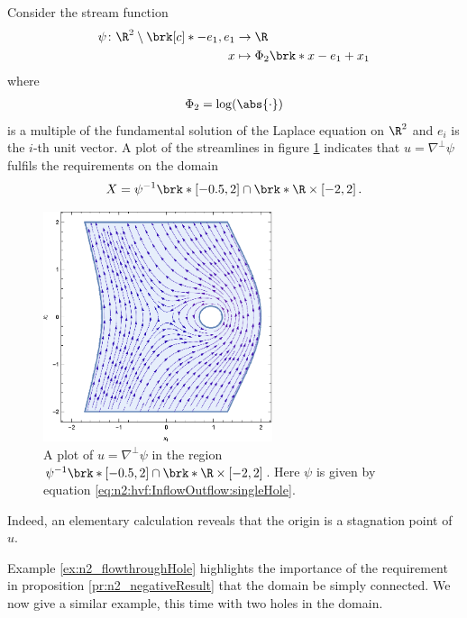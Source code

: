 \begin{example}\label{ex:n2_flowthroughHole}
  Consider the stream function
  \begin{equation}
    \begin{aligned}
    \psi\colon \R^2\setminus\brk[c]*{-e_1,e_1}&\to\R \\
    x&\mapsto\Phi_2\brk*{x-e_1}+x_1
    \end{aligned}\label{eq:n2:hvf:InflowOutflow:singleHole}
  \end{equation}
  where
  \begin{align}
    \Phi_2=\log(\abs{\cdot})\label{eq:n2_defPhi}
  \end{align}
  is a multiple of the fundamental solution of the Laplace equation on $\R^2$ and $e_i$ is the $i$-th unit vector.
  A plot of the streamlines in figure \ref{pl:n2_hvf_InflowOutflow_asymmetric_single} indicates that $u=\nabla^\perp\psi$ fulfils the
  requirements on the domain
  $$X=\psi^{-1}\brk*{[-0.5,2]}\cap \brk*{\R\times[-2,2]}\,.$$
  \begin{figure}
    \centering
    \includegraphics[width=0.6\textwidth]{../Plots/HarmonicVectorFields_gr3.eps}
    \caption{A plot of $u=\nabla^\perp\psi$ in the region $\psi^{-1}\brk*{[-0.5,2]}\cap \brk*{\R\times[-2,2]}$.
    Here $\psi$ is given by equation \eqref{eq:n2:hvf:InflowOutflow:singleHole}.}
    \label{pl:n2_hvf_InflowOutflow_asymmetric_single}
  \end{figure}
  Indeed, an elementary calculation reveals that the origin is a stagnation point of $u$.
\end{example}
Example \ref{ex:n2_flowthroughHole} highlights the importance of the requirement in proposition \ref{pr:n2_negativeResult} that the domain be simply connected.
We now give a similar example, this time with two holes in the domain.

